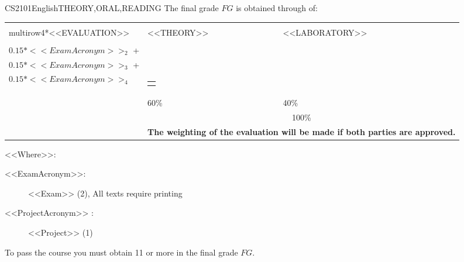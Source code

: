   \begin{evaluation}{CS2101}{English}{THEORY,ORAL,READING}
  The final grade $FG$ is obtained through of:

  \begin{tabularx}{0.9\textwidth}{|X|p{}|p{}|} \hline
    \\multirow{4}{*}{\uppercase{<<Evaluation>>}} & \uppercase{<<Theory>>} & \uppercase{<<Laboratory>>} \\ \cline{2-3}
    & %
        \begin{minipage}{0.95\textwidth}
        \begin{tabular}{l}
            $0.15* <<ExamAcronym>>_{1}$ + \\  
            $0.15* <<ExamAcronym>>_{2}$ + \\ 
            $0.15* <<ExamAcronym>>_{3}$ + \\  
            $0.15* <<ExamAcronym>>_{4}$
        \end{tabular} 
        \end{minipage} 
    & %
        \begin{minipage}{0.95\textwidth}
        \begin{tabular}{l}
            $0.40*<<ProjectAcronym>>_{1}$
            \end{tabular} 
        \end{minipage}                 \\ \cline{2-3}
    
    & %
    60\% 
    & %
    40\% \\ \cline{2-3}
    & \multicolumn{2}{c|}{100\%}  \\ \cline{2-3}
    & \multicolumn{2}{c|}{\textbf{The weighting of the evaluation will be made if both parties are approved.}}  \\ \hline
    \end{tabularx}
    
    \vspace{2mm}
    \noindent <<Where>>:
    \begin{description}
        \item[<<ExamAcronym>>:] <<Exam>> (2), All texts require printing
        \item[<<ProjectAcronym>> :] <<Project>> (1)
    \end{description}
  \noindent To pass the course you must obtain 11 or more in the final grade $FG$.
  \end{evaluation}


